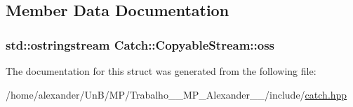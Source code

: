 \subsection{Member Data Documentation}
\hypertarget{structCatch_1_1CopyableStream_ae123fb4d673e7d7a13a3c5f6bc5d426c}{
\subsubsection[{oss}]{\setlength{\rightskip}{0pt plus 5cm}std\-::ostringstream Catch\-::\-Copyable\-Stream\-::oss}}\label{structCatch_1_1CopyableStream_ae123fb4d673e7d7a13a3c5f6bc5d426c}


The documentation for this struct was generated from the following file\-:\begin{DoxyCompactItemize}
\item 
/home/alexander/\-Un\-B/\-M\-P/\-Trabalho\-\_\-\_\-\-M\-P\-\_\-\-Alexander\-\_\-\_/include/\hyperlink{catch_8hpp}{catch.\-hpp}\end{DoxyCompactItemize}
